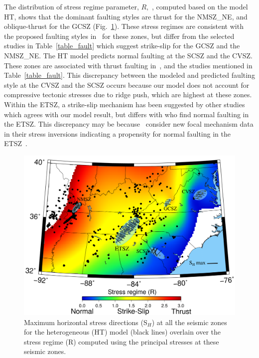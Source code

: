 \documentclass[draft,linenumbers]{agujournal2018}
\begin{document}
The distribution of stress regime parameter, $R$,~\citep{delvaux1997paleostress,simpson1997quantifying}, computed based on the model HT, shows that the dominant faulting styles are thrust for the NMSZ\_NE, and oblique-thrust for the GCSZ (Fig.~\ref{sigma1}). These stress regimes are consistent with the proposed faulting styles in~\citet{levandowski2018updated} for these zones, but differ from the selected studies in Table~\ref{table_fault} which suggest strike-slip for the GCSZ and the NMSZ\_NE.  
The HT model predicts normal faulting at the SCSZ and the CVSZ. These zones are associated with thrust faulting in~\citet{levandowski2018updated}, and the studies mentioned in Table~\ref{table_fault}. This discrepancy between the modeled and predicted faulting style at the CVSZ and the SCSZ occurs because our model does not account for compressive tectonic stresses due to ridge push, which are highest at these zones. Within the ETSZ, a strike-slip mechanism has been suggested by other studies~\citep[Table 2][]{mazzotti2010state, powell2016grenville} which agrees with our model result, but differs with \citet{levandowski2018updated} who find normal faulting in the ETSZ.  This discrepancy may be because~\citet{levandowski2018updated} consider new focal mechanism data in their stress inversions indicating a propensity for normal faulting in the ETSZ~\citep[also found in][]{cooley2015new}.

\begin{figure}[h!]
    \centering
    \includegraphics[width=0.75\linewidth]{figures/sigma1.png}
    \caption{Maximum horizontal stress directions (S$_H$) at all the seismic zones for the heterogeneous (HT) model (black lines) overlain over the stress regime (R) computed using the principal stresses at these seismic zones.  }
    \label{sigma1}
\end{figure}
\end{document}
